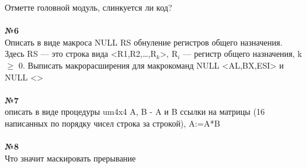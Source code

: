 \documentclass[a4paper,10pt]{article}
\begin{document}
Отметте головной модуль, слинкуется ли код? \\
\vspace{0.3cm} \\
\textbf{№6} \\
Описать в виде макроса NULL RS обнуление регистров общего назначения. Здесь RS — это строка вида <R1,R2,…,R$_k$>, R$_i$ — регистр общего назначения, k $\ge$ 0. Выписать макрорасширения для макрокоманд NULL <AL,BX,ESI> и NULL <> \\
\vspace{0.3cm} \\
\textbf{№7} \\
описать в виде процедуры um4x4 A, B - A и B ссылки на матрицы (16 написанных по порядку чисел строка за строкой), A:=A*B \\
\vspace{0.3cm} \\
\textbf{№8} \\
Что значит маскировать прерывание
\end{document}
